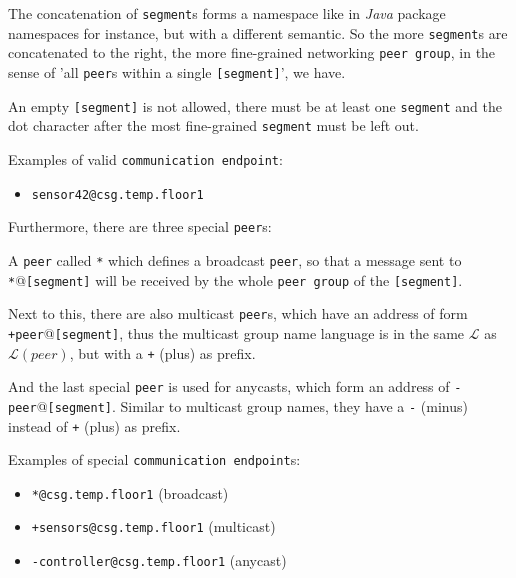 \documentclass[times,10pt,twocolumn]{article}
\begin{document}
The concatenation of \texttt{segment}s forms a namespace like in 
\textit{Java} package namespaces for instance, but with a different
semantic. So the more \texttt{segment}s are concatenated to the 
right, the more fine-grained networking \texttt{peer group}, in 
the sense of 'all \texttt{peer}s within a single \texttt{[segment]}', 
we have.\newline

An empty \texttt{[segment]} is not allowed, there must be at 
least one \texttt{segment} and the dot character after the most
fine-grained \texttt{segment} must be left out.\newline

Examples of valid \texttt{communication endpoint}:
\begin{itemize}
	\setlength{\itemsep}{-1mm}
	\item \texttt{sensor42@csg.temp.floor1}
\end{itemize}

Furthermore, there are three special \texttt{peer}s:\newline

A \texttt{peer} called \texttt{*} which defines a broadcast \texttt{peer}, 
so that a message sent to \texttt{*}@\texttt{[segment]} will be received by
the whole \texttt{peer group} of the \texttt{[segment]}.\newline

Next to this, there are also multicast \texttt{peer}s, which have an address of 
form \texttt{+peer}@\texttt{[segment]}, thus the multicast group name
language is in the same $\mathcal{L}$ as $\mathcal{L}(peer)$, but with a
\texttt{+} (plus) as prefix.\newline

And the last special \texttt{peer} is used for anycasts, which form an 
address of \texttt{-peer}@\texttt{[segment]}. Similar to multicast group 
names, they have a \texttt{-} (minus) instead of \texttt{+} (plus) as 
prefix.\newline

Examples of special \texttt{communication endpoint}s:
\begin{itemize}
	\setlength{\itemsep}{-1mm}
	\item \texttt{*@csg.temp.floor1} (broadcast)
	\item \texttt{+sensors@csg.temp.floor1} (multicast)
	\item \texttt{-controller@csg.temp.floor1} (anycast)
\end{itemize}
\end{document}
